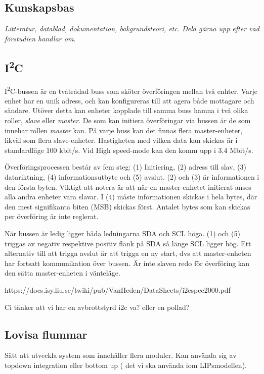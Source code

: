 \documentclass[11pt]{article}
\begin{document}
\begin{flushleft}
\pagebreak

\section{Kunskapsbas}
\textit{Litteratur, datablad, dokumentation, bakgrundsteori, etc. Dela gärna upp efter vad förstudien handlar om.}

\subsection{I\textsuperscript{2}C}
I\textsuperscript{2}C-bussen är en tvåtrådad buss som sköter överföringen mellan två enhter. Varje enhet har en unik adress, och kan konfigureras till att agera både mottagare och sändare. Utöver detta kan enheter kopplade till samma buss hamna i två olika roller, \textit{slave} eller \textit{master}. De som kan initiera överföringar via bussen är de som innehar rollen \textit{master} kan. På varje buss kan det finnas flera master-enheter, likväl som flera slave-enheter. Hastigheten med vilken data kan skickas är i standardläge 100 kbit/s. Vid High speed-mode kan den komm upp i 3.4 Mbit/s.

Överföringsprocessen består av fem steg: (1) Initiering, (2) adress till slav, (3) datariktning, (4) informationsutbyte och (5) avslut. (2) och (3) är informationen i den första byten. Viktigt att notera är att när en master-enhetet initierat anses alla andra enheter vara slavar. I (4) måste informationen skickas i hela bytes, där den mest signifikanta biten (MSB) skickas först. Antalet bytes som kan skickas per överföring är inte reglerat.

När bussen är ledig ligger båda ledningarna SDA och SCL höga. (1) och (5) triggas av negativ respektive positiv flank på SDA så länge SCL ligger hög. Ett alternativ till att trigga avslut är att trigga en ny start, dvs att master-enheten har fortsatt kommunikation över bussen. Är inte slaven redo för överföring kan den sätta master-enheten i vänteläge.

https://docs.isy.liu.se/twiki/pub/VanHeden/DataSheets/i2cspec2000.pdf

Ci tänker att vi har en avbrottstyrd i2c va? eller en pollad?


\subsection{Lovisa flummar}



Sätt att utveckla system som innehåller flera moduler.
Kan använda sig av topdown integration eller bottom up ( det vi ska använda iom LIPsmodellen).


\end{flushleft}
\end{document}
